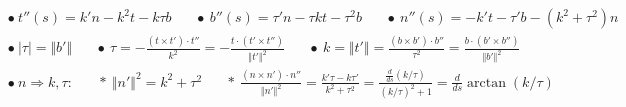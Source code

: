 \documentclass[12pt]{article}
\begin{document}
\vspace{10pt} \noindent
\(\begin{aligned}
    & \bullet\ t''(s) = k' n - k^2 t - k\tau b 
        \hspace{20pt} \bullet\ b''(s) = \tau' n - \tau kt - \tau^2 b
        \hspace{20pt} \bullet\ n''(s) = -k't -\tau'b - (k^2 + \tau^2) n
        \\
    & \bullet\ |\tau| = \Vert b' \Vert 
        \hspace{20pt}
        \bullet\ \tau = -\tfrac{ ( t \times t' ) \cdot t'' }{k^2} = -\tfrac{ {t} \cdot ( {t'} \times t'' )}{\Vert t' \Vert^2} 
        \hspace{20pt} 
        \bullet\ k = \Vert t' \Vert = \tfrac{ ( b \times b' ) \cdot b'' }{\tau^2} 
        = \tfrac{ {b} \cdot ( {b'} \times b'' )}{\Vert b' \Vert^2}
        \\
    & \bullet\ n \Rightarrow k,\tau:
        \hspace{20pt}
        \ast\ \Vert n' \Vert^2 = k^2 + \tau^2
        \hspace{20pt}
        \ast\ \tfrac{ ( n \times n' ) \cdot n'' }{\Vert n' \Vert^2} = \tfrac{k' \tau - k \tau'}{k^2 + \tau^2}
        = \tfrac{ \tfrac{d}{ds} (k / \tau) }{(k/\tau)^2 + 1} = \tfrac{d}{ds} \arctan(k/\tau)
\end{aligned}\)
\end{document}
